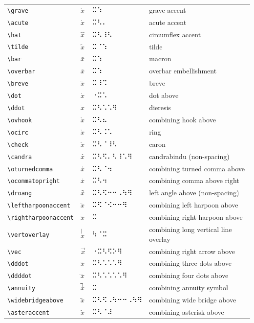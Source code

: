 \documentclass[oneside]{article}
\begin{document}
\begin{longtable}{llll}
\verb|\grave| & $\grave{x}$ &  ⠭⠱  & {grave accent} \\[2ex]
\verb|\acute| & $\acute{x}$ &  ⠭⠣⠄  & {acute accent} \\[2ex]
\verb|\hat| & $\hat{x}$ &  ⠭⠣⠸⠣  & {circumflex accent} \\[2ex]
\verb|\tilde| & $\tilde{x}$ &  ⠭⠈⠱  & {tilde} \\[2ex]
\verb|\bar| & $\bar{x}$ &  ⠭⠱  & {macron} \\[2ex]
\verb|\overbar| & $\overbar{x}$ &  ⠭⠱  & {overbar embellishment} \\[2ex]
\verb|\breve| & $\breve{x}$ &  ⠭⠸⠩  & {breve} \\[2ex]
\verb|\dot| & $\dot{x}$ &  ⠐⠭⠡  & {dot above} \\[2ex]
\verb|\ddot| & $\ddot{x}$ &  ⠭⠣⠡⠡⠻  & {dieresis} \\[2ex]
\verb|\ovhook| & $\ovhook{x}$ &  ⠭⠣⠦  & {combining hook above} \\[2ex]
\verb|\ocirc| & $\ocirc{x}$ &  ⠭⠣⠨⠡  & {ring} \\[2ex]
\verb|\check| & $\check{x}$ &  ⠭⠣⠈⠸⠣  & {caron} \\[2ex]
\verb|\candra| & $\candra{x}$ &  ⠭⠣⠫⠄⠣⠸⠡⠻  & {candrabindu (non-spacing)} \\[2ex]
\verb|\oturnedcomma| & $\oturnedcomma{x}$ &  ⠭⠣⠈⠲  & {combining turned comma above} \\[2ex]
\verb|\ocommatopright| & $\ocommatopright{x}$ &  ⠭⠣⠲  & {combining comma above right} \\[2ex]
\verb|\droang| & $\droang{x}$ &  ⠭⠣⠫⠒⠒⠠⠳⠻  & {left angle above (non-spacing)} \\[2ex]
\verb|\leftharpoonaccent| & $\leftharpoonaccent{x}$ &  ⠭⠫⠈⠪⠒⠒⠻  & {combining left harpoon above} \\[2ex]
\verb|\rightharpoonaccent| & $\rightharpoonaccent{x}$ &  ⠭  & {combining right harpoon above} \\[2ex]
\verb|\vertoverlay| & $\vertoverlay{x}$ &  ⠳⠈⠭  & {combining long vertical line overlay} \\[2ex]
\verb|\vec| & $\vec{x}$ &  ⠐⠭⠣⠫⠕⠻  & {combining right arrow above} \\[2ex]
\verb|\dddot| & $\dddot{x}$ &  ⠭⠣⠡⠡⠡⠻  & {combining three dots above} \\[2ex]
\verb|\ddddot| & $\ddddot{x}$ &  ⠭⠣⠡⠡⠡⠡⠻  & {combining four dots above} \\[2ex]
\verb|\annuity| & $\annuity{x}$ &  ⠭  & {combining annuity symbol} \\[2ex]
\verb|\widebridgeabove| & $\widebridgeabove{x}$ &  ⠭⠣⠫⠠⠳⠒⠒⠠⠳⠻  & {combining wide bridge above} \\[2ex]
\verb|\asteraccent| & $\asteraccent{x}$ &  ⠭⠣⠈⠼  & {combining asterisk above} \\[2ex]
\end{longtable}
\end{document}
